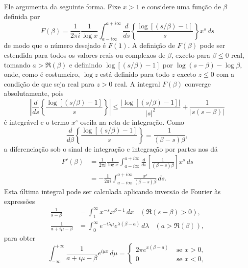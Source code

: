     Ele argumenta da seguinte forma. Fixe $x > 1$ e considere uma função de $\beta$ definida por 
    \begin{equation*}
         F(\beta) = \frac{1}{2\pi i} \frac{1}{\log x} \int_{a - i\infty}^{a + i\infty} \frac{d}{ds} \left\{ \frac{\log[(s/\beta)-1]}{s} \right\} x^s \, ds
    \end{equation*}
    de modo que o número desejado é $F(1)$. A definição de $F(\beta)$ pode ser estendida para todos os valores reais ou complexos de $\beta$, exceto para $\beta \leq 0$ real, tomando $a > \Re(\beta)$ e definindo $\log[(s/\beta) - 1]$ por $\log (s - \beta) - \log \beta$, onde, como é costumeiro, $\log z$ está definido para todo $z$ exceto $z \leq 0$ com a condição de que seja real para $z> 0$ real. A integral $F(\beta)$ converge absolutamente, pois
    \begin{equation*}
        \left | \frac{d}{ds} \left\{ \frac{\log[(s/\beta)-1]}{s} \right\} \right | \leq \frac{| \log[(s/\beta)-1] |}{|s|^2} + \frac{1}{|s(s-\beta)|}
    \end{equation*}
    é integrável e o termo $x^s$ oscila na reta de integração. Como
    \begin{equation*}
        \frac{d}{d\beta} \left\{ \frac{\log[(s/\beta)-1]}{s} \right\} = \frac{1}{(\beta -s) \beta},
    \end{equation*}
    a diferenciação sob o sinal de integração e integração por partes nos dá
    \begin{align*}
        F'(\beta) &= \frac{1}{2\pi i} \frac{1}{\log x} \int_{a - i\infty}^{a + i\infty} \frac{d}{ds} \left[ \frac{1}{(\beta - s) \beta} \right] x^s \, ds \\
        &= -\frac{1}{2\pi i} \int_{a - i\infty}^{a + i\infty}  \frac{x^s}{(\beta - s) \beta} \, ds.
    \end{align*}
    Esta última integral pode ser calculada aplicando inversão de Fourier às expressões
    \begin{align*}
        \frac{1}{s -\beta} &= \int_{1}^{\infty} x^{-s}x^{\beta -1} \, dx \ \ \ \ (\Re(s-\beta) > 0), \\
        \frac{1}{a + i\mu -\beta} &= \int_{0}^{\infty} e^{-i \lambda \mu}e^{\lambda(\beta - a)} \, d\lambda \ \ \ \ (a > \Re(\beta)),
    \end{align*}
    para obter
    \begin{equation}
        \label{sec-1-14-(1)}
        \int_{-\infty}^{+\infty} \frac{1}{a + i\mu -\beta} e^{i \mu x} \, d\mu =
        \begin{cases}
            2 \pi e^{x(\beta - a)} &\text{ se } x > 0, \\
            0 &\text{ se } x < 0,
        \end{cases}
    \end{equation}
